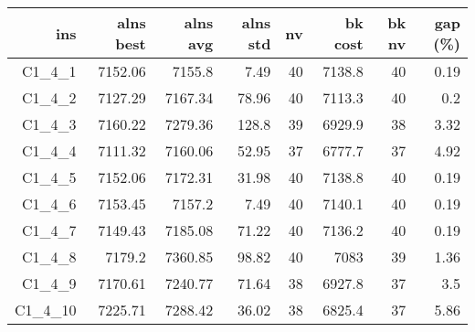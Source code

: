  \begin{table}[caption={Kết quả đo với tập HG\_C\_1\_4 400 yêu cầu}, label=exp:HGC14]
    \centering
    \begin{tabular}{rrrrrrrr}
    \hline
    ins & alns best & alns avg & alns std & nv & bk cost & bk nv & gap (\%) \\ \hline
    C1\_4\_1 & 7152.06 & 7155.8 & 7.49 & 40 & 7138.8 & 40 & 0.19 \\ \hline
    C1\_4\_2 & 7127.29 & 7167.34 & 78.96 & 40 & 7113.3 & 40 & 0.2 \\ \hline
    C1\_4\_3 & 7160.22 & 7279.36 & 128.8 & 39 & 6929.9 & 38 & 3.32 \\ \hline
    C1\_4\_4 & 7111.32 & 7160.06 & 52.95 & 37 & 6777.7 & 37 & 4.92 \\ \hline
    C1\_4\_5 & 7152.06 & 7172.31 & 31.98 & 40 & 7138.8 & 40 & 0.19 \\ \hline
    C1\_4\_6 & 7153.45 & 7157.2 & 7.49 & 40 & 7140.1 & 40 & 0.19 \\ \hline
    C1\_4\_7 & 7149.43 & 7185.08 & 71.22 & 40 & 7136.2 & 40 & 0.19 \\ \hline
    C1\_4\_8 & 7179.2 & 7360.85 & 98.82 & 40 & 7083 & 39 & 1.36 \\ \hline
    C1\_4\_9 & 7170.61 & 7240.77 & 71.64 & 38 & 6927.8 & 37 & 3.5 \\ \hline
    C1\_4\_10 & 7225.71 & 7288.42 & 36.02 & 38 & 6825.4 & 37 & 5.86 \\ \hline
    \end{tabular}
  \end{table}

